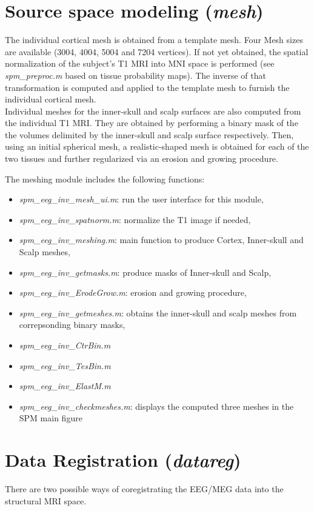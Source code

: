 \section{Source space modeling (\textit{mesh})}
The individual cortical mesh is obtained from a template mesh. Four Mesh sizes are available (3004, 4004, 5004 and 7204 vertices). If not yet obtained, the spatial normalization of the subject's T1 MRI into MNI space is performed (see \textit{spm\_preproc.m} based on tissue probability maps). The inverse of that transformation is computed and applied to the template mesh to furnish the individual cortical mesh.\\

Individual meshes for the inner-skull and scalp surfaces are also computed from the individual T1 MRI. They are obtained by performing a binary mask of the the volumes delimited by the inner-skull and scalp surface respectively. Then, using an initial spherical mesh, a realistic-shaped mesh is obtained for each of the two tissues and further regularized via an erosion and growing procedure.

The meshing module includes the following functions:
\begin{itemize}
    \item \textit{spm\_eeg\_inv\_mesh\_ui.m}: run the user interface for this module,
    \item \textit{spm\_eeg\_inv\_spatnorm.m}: normalize the T1 image if needed,
    \item \textit{spm\_eeg\_inv\_meshing.m}: main function to produce Cortex, Inner-skull and Scalp meshes,
    \item \textit{spm\_eeg\_inv\_getmasks.m}: produce masks of Inner-skull and Scalp,
    \item \textit{spm\_eeg\_inv\_ErodeGrow.m}: erosion and growing procedure,
    \item \textit{spm\_eeg\_inv\_getmeshes.m}: obtains the inner-skull and scalp meshes from correpsonding binary masks,
    \item \textit{spm\_eeg\_inv\_CtrBin.m}
    \item \textit{spm\_eeg\_inv\_TesBin.m}
    \item \textit{spm\_eeg\_inv\_ElastM.m}
    \item \textit{spm\_eeg\_inv\_checkmeshes.m}: displays the computed three meshes in the SPM main figure
\end{itemize}


\section{Data Registration (\textit{datareg})}
\label{sec:datareg}
There are two possible ways of coregistrating the EEG/MEG data into the structural MRI space.

